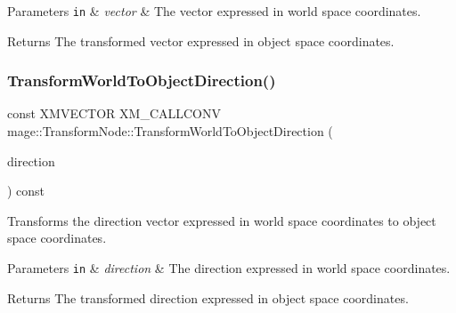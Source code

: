 \begin{DoxyParams}[1]{Parameters}
\mbox{\tt in}  & {\em vector} & The vector expressed in world space coordinates. \\
\hline
\end{DoxyParams}
\begin{DoxyReturn}{Returns}
The transformed vector expressed in object space coordinates. 
\end{DoxyReturn}
\hypertarget{structmage_1_1_transform_node_aac30202006ee4ccc2b9e05adb145656b}{}\label{structmage_1_1_transform_node_aac30202006ee4ccc2b9e05adb145656b} 
\subsubsection{\texorpdfstring{Transform\+World\+To\+Object\+Direction()}{TransformWorldToObjectDirection()}}
{\footnotesize\ttfamily const X\+M\+V\+E\+C\+T\+OR X\+M\+\_\+\+C\+A\+L\+L\+C\+O\+NV mage\+::\+Transform\+Node\+::\+Transform\+World\+To\+Object\+Direction (\begin{DoxyParamCaption}\item[{F\+X\+M\+V\+E\+C\+T\+OR}]{direction }\end{DoxyParamCaption}) const\hspace{0.3cm}{\ttfamily [noexcept]}}

Transforms the direction vector expressed in world space coordinates to object space coordinates.


\begin{DoxyParams}[1]{Parameters}
\mbox{\tt in}  & {\em direction} & The direction expressed in world space coordinates. \\
\hline
\end{DoxyParams}
\begin{DoxyReturn}{Returns}
The transformed direction expressed in object space coordinates. 
\end{DoxyReturn}
\hypertarget{structmage_1_1_transform_node_a792410956cd6577f3f840341d152ca8a}{}\label{structmage_1_1_transform_node_a792410956cd6577f3f840341d152ca8a} 
